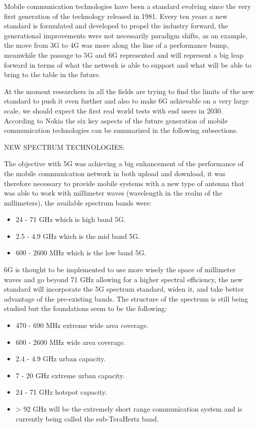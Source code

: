

Mobile communication technologies have been a standard evolving since the very first
generation of the technology released in 1981. Every ten years a new standard is formulated and
developed to propel the industry forward, the generational improvements were not necessarily
paradigm shifts, as an example, the move from 3G to 4G was more along the line of a performance bump,
meanwhile the passage to 5G and 6G represented and will represent a big leap forward in terms of
what the network is able to support and what will be able to bring to the table in the future.

At the moment researchers in all the fields are trying to find the limits of the new standard to
push it even further and also to make 6G achievable on a very large scale, we should expect the
first real world tests with end users in 2030. According to Nokia\cite{nokiabell} the six key aspects of the future generation of mobile communication technologies can be summarized in the following subsections.

\bigskip
\noindent
NEW SPECTRUM TECHNOLOGIES:
\label{ssec:spectrum-technologies}

The objective with 5G was achieving a big enhancement of the performance of the mobile communication
network in both upload and download, it was therefore necessary to provide mobile systems with a new
type of antenna that was able to work with millimeter waves (wavelength in the realm of the
millimeters), the available spectrum bands were:
\begin{itemize}
	\item 24 - 71 GHz which is high band 5G.
	\item 2.5 - 4.9 GHz which is the mid band 5G.
	\item 600 - 2600 MHz which is the low band 5G.
\end{itemize}
6G is thought to be implemented to use more wisely the space of millimeter waves and go beyond 71
GHz allowing for a higher spectral efficiency, the new standard will incorporate the 5G spectrum
standard, widen it, and take better advantage of the pre-existing bands. The structure of the spectrum is still being studied but the foundations seem to be the following:
\begin{itemize}
	\item 470 - 690 MHz extreme wide area coverage.
	\item 600 - 2600 MHz wide area coverage.
	\item 2.4 - 4.9 GHz urban capacity.
	\item 7 - 20 GHz extreme urban capacity.
	\item 24 - 71 GHz hotspot capacity.
	\item > 92 GHz will be the extremely short range communication system and is currently being
	      called the sub-TeraHertz band.
\end{itemize}

